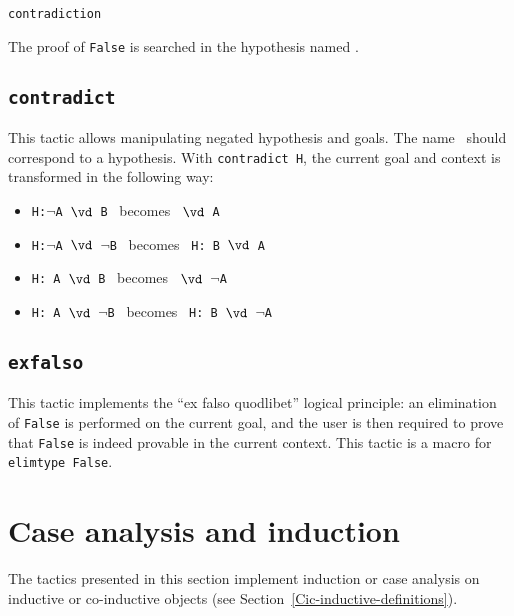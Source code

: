 \begin{coq_example*}
\begin{ErrMsgs}
\item {}
\end{ErrMsgs}

\begin{Variants}
\item {\tt contradiction \ident}

The proof of {\tt False} is searched in the hypothesis named \ident.
\end{Variants}

\subsection{\tt contradict \ident}
\label{contradict}

This tactic allows manipulating negated hypothesis and goals. The
name \ident\ should correspond to a hypothesis. With
{\tt contradict H}, the current goal and context is transformed in
the following way:
\begin{itemize}
\item  {\tt H:$\neg$A $\vd$  B} \ becomes \ {\tt $\vd$ A}
\item  {\tt H:$\neg$A $\vd$ $\neg$B} \  becomes \ {\tt H: B $\vd$  A }
\item  {\tt H: A $\vd$  B} \ becomes \ {\tt $\vd$ $\neg$A}
\item  {\tt H: A $\vd$ $\neg$B} \ becomes \ {\tt H: B $\vd$ $\neg$A}
\end{itemize}

\subsection{\tt exfalso}
\label{exfalso}

This tactic implements the ``ex falso quodlibet'' logical principle:
an elimination of {\tt False} is performed on the current goal, and the
user is then required to prove that {\tt False} is indeed provable in
the current context. This tactic is a macro for {\tt elimtype False}.

\section{Case analysis and induction}

The tactics presented in this section implement induction or case
analysis on inductive or co-inductive objects (see
Section~\ref{Cic-inductive-definitions}).


\end{coq_example*}
